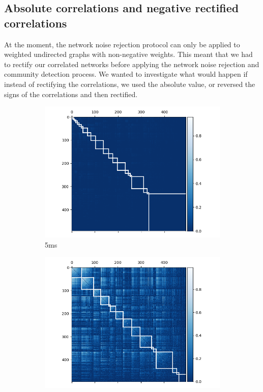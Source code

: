   \subsection{Absolute correlations and negative rectified correlations}
  At the moment, the network noise rejection protocol can only be applied to weighted undirected graphs with non-negative weights. This meant that we had to rectify our correlated networks before applying the network noise rejection and community detection process. We wanted to investigate what would happen if instead of rectifying the correlations, we used the absolute value, or reversed the signs of the correlations and then rectified.

  \begin{figure}[p]
    \begin{subfigure}[h]{0.5\linewidth}
      \includegraphics[width=\linewidth]{figures/eight_probe/Krebs_0p005_absolute_cons_cluster_map.png}
      \caption{5ms}
      \label{fig:absolute_consensus_cluster_5ms}
    \end{subfigure}
    \begin{subfigure}[h]{0.5\linewidth}
      \includegraphics[width=\linewidth]{figures/eight_probe/Krebs_1p0_absolute_cons_cluster_map.png}

\end{subfigure}
\end{figure}
